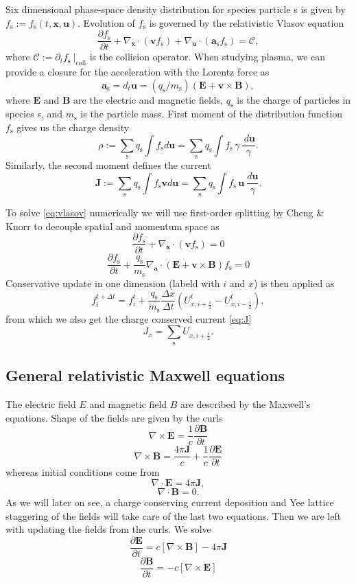 \documentclass{aa}
\newcommand{\be}{\begin{equation}}
\newcommand{\ee}{\end{equation}}
\newcommand{\D}[2]{\ensuremath{\frac{\partial {#1} }{\partial {#2} }}}
\newcommand{\f}[1]{\ensuremath{f_{\mathrm{ {#1} }}}}
\renewcommand{\vec}[1]{\ensuremath{\boldsymbol{#1}}}
\begin{document}
Six dimensional phase-space density distribution for species particle s is given by $\f{s} := \f{s}(t, \vec{x}, \vec{u})$.
Evolution of $\f{s}$ is governed by the relativistic Vlasov equation
\be\label{eq:vlasov}
\D{\f{s}}{t} + \nabla_{\vec{x}} \cdot (\vec{v} \f{s}) + \nabla_{\vec{u}} \cdot (\vec{a}_{\mathrm{s}} \f{s} ) = \mathcal{C},
\ee
where $\mathcal{C} := \partial_t \f{s} ~|_{\mathrm{coll}}$ is the collision operator.
When studying plasma, we can provide a closure for the acceleration with the Lorentz force as 
\be
\vec{a}_{\mathrm{s}} = d_t \vec{u} = (q_{\mathrm{s}} / m_{\mathrm{s}} )(\vec{E} + \vec{v} \times \vec{B}),
\ee
where $\vec{E}$ and $\vec{B}$ are the electric and magnetic fields, $q_{\mathrm{s}}$ is the charge of particles in species s, and $m_{\mathrm{s}}$ is the particle mass.
First moment of the distribution function $\f{s}$ gives us the charge density
\be
\rho := \sum_{\mathrm{s}} q_{\mathrm{s}} \int \f{s} d\vec{u} = \sum_{\mathrm{s}} q_{\mathrm{s}} \int \f{s} \, \gamma \, \frac{ ~d\vec{u}}{\gamma}.
\ee
Similarly, the second moment defines the current
\be\label{eq:J}
\vec{J} := \sum_{\mathrm{s}} q_{\mathrm{s}} \int \f{s} \vec{v} d\vec{u} = \sum_{\mathrm{s}} q_{\mathrm{s}} \int \f{s} \, \vec{u} ~\frac{ d\vec{u}}{\gamma}.
\ee

To solve \eqref{eq:vlasov} numerically we will use first-order splitting by Cheng \& Knorr to decouple spatial and momentum space as
\be
\D{\f{s}}{t} + \nabla_{\vec{x}} \cdot (\vec{v} \f{s} ) = 0
\ee
\be
\D{\f{s}}{t} +\frac{q_{\mathrm{s}}}{m_{\mathrm{s}}} \nabla_{\vec{a}} \cdot ( \vec{E} + \vec{v} \times \vec{B} ) \f{s} = 0
\ee
Conservative update in one dimension (labeld with $i$ and $x$) is then applied as
\be
f_{i}^{t+\Delta t} = f_{i}^{t} + \frac{q_{\mathrm{s}}}{m_{\mathrm{s}}}  \frac{\Delta x}{\Delta t}( U_{x, i+\frac{1}{2}}^t - U_{x, i-\frac{1}{2}}^t ),
\ee
from which we also get the charge conserved current \eqref{eq:J}
\be
J_x = \sum_{\mathrm{s}} U_{x, i+\frac{1}{2}}.
\ee



\subsection{General relativistic Maxwell equations}
The electric field $E$ and magnetic field $B$ are described by the Maxwell's equations.
Shape of the fields are given by the curls
\be
\nabla \times \vec{E} = \frac{1}{c} \frac{\partial \vec{B}} {\partial t}
\ee
\be
\nabla \times \vec{B} = \frac{4 \pi \vec{J}}{c} + \frac{1}{c} \frac{\partial \vec{E}} {\partial t}
\ee
whereas initial conditions come from
\be
\nabla \cdot \vec{E} = 4\pi\vec{J},
\ee
\be
\nabla \cdot \vec{B} = 0.
\ee
As we will later on see, a charge conserving current deposition and Yee lattice staggering of the fields will take care of the last two equations.
Then we are left with updating the fields from the curls.
We solve
\be
\frac{\partial \vec{E}}{\partial t} = c [ \nabla \times \vec{B}] - 4\pi \vec{J}
\ee
\be
\frac{\partial \vec{B}}{\partial t} = -c[ \nabla \times \vec{E}]
\ee
\end{document}
